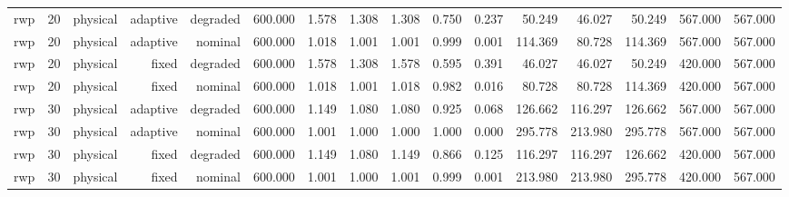 \begin{tabular}{lrrrrrrrrrrrrrrr}
rwp & 20 & physical & adaptive & degraded & 600.000 & 1.578 & 1.308 & 1.308 & 0.750 & 0.237 & 50.249 & 46.027 & 50.249 & 567.000 & 567.000 \\
rwp & 20 & physical & adaptive & nominal & 600.000 & 1.018 & 1.001 & 1.001 & 0.999 & 0.001 & 114.369 & 80.728 & 114.369 & 567.000 & 567.000 \\
rwp & 20 & physical & fixed & degraded & 600.000 & 1.578 & 1.308 & 1.578 & 0.595 & 0.391 & 46.027 & 46.027 & 50.249 & 420.000 & 567.000 \\
rwp & 20 & physical & fixed & nominal & 600.000 & 1.018 & 1.001 & 1.018 & 0.982 & 0.016 & 80.728 & 80.728 & 114.369 & 420.000 & 567.000 \\
rwp & 30 & physical & adaptive & degraded & 600.000 & 1.149 & 1.080 & 1.080 & 0.925 & 0.068 & 126.662 & 116.297 & 126.662 & 567.000 & 567.000 \\
rwp & 30 & physical & adaptive & nominal & 600.000 & 1.001 & 1.000 & 1.000 & 1.000 & 0.000 & 295.778 & 213.980 & 295.778 & 567.000 & 567.000 \\
rwp & 30 & physical & fixed & degraded & 600.000 & 1.149 & 1.080 & 1.149 & 0.866 & 0.125 & 116.297 & 116.297 & 126.662 & 420.000 & 567.000 \\
rwp & 30 & physical & fixed & nominal & 600.000 & 1.001 & 1.000 & 1.001 & 0.999 & 0.001 & 213.980 & 213.980 & 295.778 & 420.000 & 567.000 \\
\bottomrule
\end{tabular}
